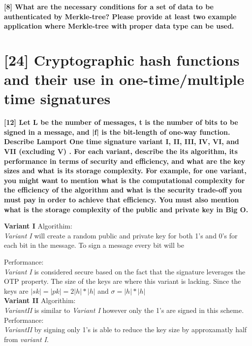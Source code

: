 \documentclass[letterpaper,11pt,notitlepage,fleqn]{article}
\begin{document}
\noindent \textbf{[8] What are the necessary conditions for a set of data to be authenticated by Merkle-tree? Please provide at least two example application where Merkle-tree with proper data type can be used.}

\section{[24] Cryptographic hash functions and their use in one-time/multiple time signatures}

\noindent \textbf{[12] Let L be the number of messages, t is the number of bits to be signed in a message, and |f| is the bit-length of one-way function. Describe Lamport One time signature variant I, II, III, IV, VI, and VII (excluding V) . For each variant, describe the its algorithm, its performance in terms of security and efficiency,  and what are the key sizes and what is its storage complexity. For example, for one variant, you might want to mention what is the computational complexity for the
efficiency  of the algorithm and what is the security trade-off you must pay in order to achieve that efficiency. You must also mention what is the storage complexity of the public and private key in Big O.} 

\textbf{Variant I}
\noindent Algorithim:\\
\indent \textit{Variant I} will create a random public and private key for both 1's and 0's for each bit in the message. To sign a message every bit will be 

\noindent Performance:\\
\indent \textit{Variant I} is considered secure based on the fact that the signature leverages the OTP property. The size of the keys are where this variant is lacking. Since the keys are $|sk|=|pk|=2|h|\ast|h|$ and $\sigma = |h|\ast|h|$ \\

\textbf{Variant II}
\noindent Algorithim:\\
\indent \textit{VariantII} is similar to \textit{Variant I} however only the 1's are signed in this scheme. 
\noindent Performance:\\
\indent \textit{VariantII} by signing only 1's is able to reduce the key size by approxamatly half from \textit{variant I}.
\end{document}
